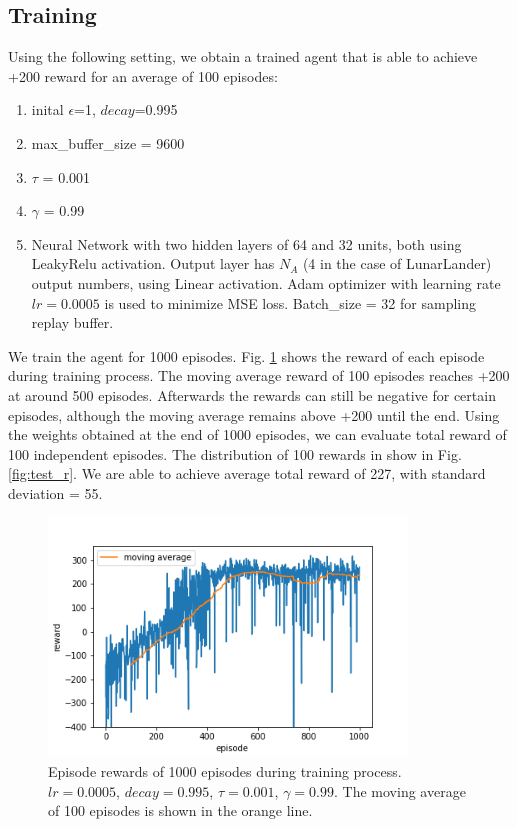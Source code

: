 \documentclass[conference]{IEEEtran}
\begin{document}
\subsection{Training}
Using the following setting, we obtain a trained agent that is able to achieve +200 reward for an average of 100 episodes:
\begin{enumerate}
\item inital $\epsilon$=1, $decay$=0.995
\item max\_buffer\_size = 9600
\item $\tau$ = 0.001
\item $\gamma$ = 0.99
\item Neural Network with two hidden layers of 64 and 32 units, both using LeakyRelu activation. Output layer has $N_A$ (4 in the case of LunarLander) output numbers, using Linear activation. Adam optimizer with learning rate $lr=0.0005$ is used to minimize MSE loss. Batch\_size = 32 for sampling replay buffer.
\end{enumerate}
We train the agent for 1000 episodes. Fig. \ref{fig:training_r} shows the reward of each episode during training process. The moving average reward of 100 episodes reaches +200 at around 500 episodes. Afterwards the rewards can still be negative for certain episodes, although the moving average remains above +200 until the end. Using the weights obtained at the end of 1000 episodes, we can evaluate total reward of 100 independent episodes. The distribution of 100 rewards in show in Fig. \ref{fig:test_r}. We are able to achieve average total reward of 227, with standard deviation = 55.

\begin{figure}
\includegraphics[height=2.5in]{figures/training_rewards.png} 
\caption{Episode rewards of 1000 episodes during training process. $lr=0.0005$, $decay=0.995$, $\tau=0.001$, $\gamma=0.99$. The moving average of 100 episodes is shown in the orange line.}
\label{fig:training_r}
\end{figure}
	
\end{document}

